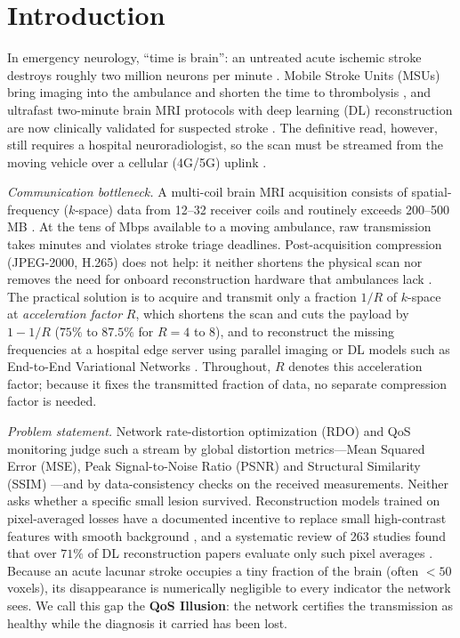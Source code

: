 \documentclass[conference]{IEEEtran}
\begin{document}
\section{Introduction}
\label{sec:intro}

In emergency neurology, ``time is brain'': an untreated acute ischemic stroke destroys roughly two million neurons per minute \cite{saver2006time}. Mobile Stroke Units (MSUs) bring imaging into the ambulance and shorten the time to thrombolysis \cite{fassbender2017mobile}, and ultrafast two-minute brain MRI protocols with deep learning (DL) reconstruction are now clinically validated for suspected stroke \cite{altmann2024ultrafast,lang2024twominute}. The definitive read, however, still requires a hospital neuroradiologist, so the scan must be streamed from the moving vehicle over a cellular (4G/5G) uplink \cite{ahad2019healthcare,mahmeen2021radiology}.

\textit{Communication bottleneck.} A multi-coil brain MRI acquisition consists of spatial-frequency ($k$-space) data from 12--32 receiver coils and routinely exceeds 200--500\,MB \cite{zbontar2018fastmri}. At the tens of Mbps available to a moving ambulance, raw transmission takes minutes and violates stroke triage deadlines. Post-acquisition compression (JPEG-2000, H.265) does not help: it neither shortens the physical scan nor removes the need for onboard reconstruction hardware that ambulances lack \cite{wang2020convergence}. The practical solution is to acquire and transmit only a fraction $1/R$ of $k$-space at \emph{acceleration factor} $R$, which shortens the scan and cuts the payload by $1-1/R$ ($75\%$ to $87.5\%$ for $R=4$ to $8$), and to reconstruct the missing frequencies at a hospital edge server using parallel imaging \cite{pruessmann1999sense} or DL models such as End-to-End Variational Networks \cite{sriram2020endtoend}. Throughout, $R$ denotes this acceleration factor; because it fixes the transmitted fraction of data, no separate compression factor is needed.

\textit{Problem statement.} Network rate-distortion optimization (RDO) and QoS monitoring judge such a stream by global distortion metrics---Mean Squared Error (MSE), Peak Signal-to-Noise Ratio (PSNR) and Structural Similarity (SSIM) \cite{wang2004image}---and by data-consistency checks on the received measurements. Neither asks whether a specific small lesion survived. Reconstruction models trained on pixel-averaged losses have a documented incentive to replace small high-contrast features with smooth background \cite{antun2020instabilities,bhadra2021hallucinations}, and a systematic review of 263 studies found that over $71\%$ of DL reconstruction papers evaluate only such pixel averages \cite{mai2026metric}. Because an acute lacunar stroke occupies a tiny fraction of the brain (often $<50$ voxels), its disappearance is numerically negligible to every indicator the network sees. We call this gap the \textbf{QoS Illusion}: the network certifies the transmission as healthy while the diagnosis it carried has been lost.
\end{document}
